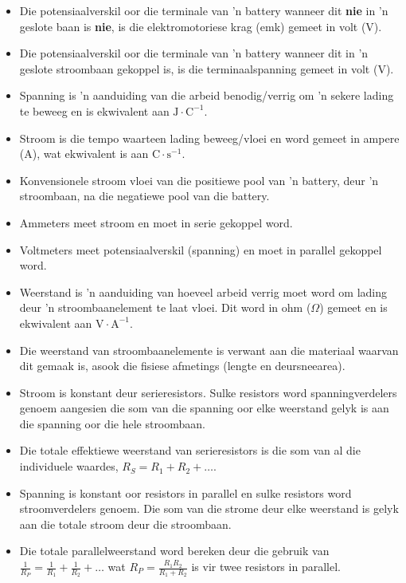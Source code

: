 \label{m38781*id201947}\begin{itemize}[noitemsep ] 
\item Die potensiaalverskil oor die terminale van 'n battery wanneer dit
\textbf{nie} in 'n geslote baan is \textbf{nie}, is die elektromotoriese krag
(emk) gemeet in volt (V).
\item Die potensiaalverskil oor die terminale van 'n battery wanneer dit in
 'n geslote stroombaan gekoppel is, is die terminaalspanning gemeet in volt (V).
\item Spanning is 'n aanduiding van die arbeid benodig/verrig om 'n sekere
lading te beweeg en is ekwivalent aan $\text{J}\cdot\text{C}^{-1}$.
\item Stroom is die tempo waarteen lading beweeg/vloei en word gemeet in ampere
(A), wat ekwivalent is aan $\text{C}\cdot\text{s}^{-1}$.
\item Konvensionele stroom vloei van die positiewe pool van 'n battery,
deur 'n stroombaan, na die negatiewe pool van die battery.
\item Ammeters meet stroom en moet in serie gekoppel word.
\item Voltmeters meet potensiaalverskil (spanning) en moet in parallel
gekoppel word.
\item Weerstand is 'n aanduiding van hoeveel arbeid verrig moet word om lading
deur 'n stroombaanelement te laat vloei. Dit word in ohm ($\Omega$) gemeet en
is ekwivalent aan  $\text{V}\cdot\text{A}^{-1}$.
\item Die weerstand van stroombaanelemente is verwant aan die materiaal waarvan
dit gemaak is, asook die fisiese afmetings (lengte en deursneearea).
\item Stroom is konstant deur serieresistors. Sulke resistors word
spanningverdelers genoem aangesien die som van die spanning oor elke weerstand
gelyk is aan die spanning oor die hele stroombaan.
\item Die totale effektiewe weerstand van serieresistors is die som van al die
individuele waardes, $R_S=R_1+R_2+\ldots$.
\item Spanning is konstant oor resistors in parallel en sulke resistors
word stroomverdelers genoem. Die som van die strome deur elke weerstand is
gelyk aan die totale stroom deur die stroombaan.
\item Die totale parallelweerstand word bereken deur die gebruik van 
$\frac{1}{R_P}=\frac{1}{R_1}+\frac{1}{R_2}+\ldots$ wat
$R_P=\frac{R_1R_2}{R_1+R_2}$ is vir twee resistors in parallel.
\end{itemize}

